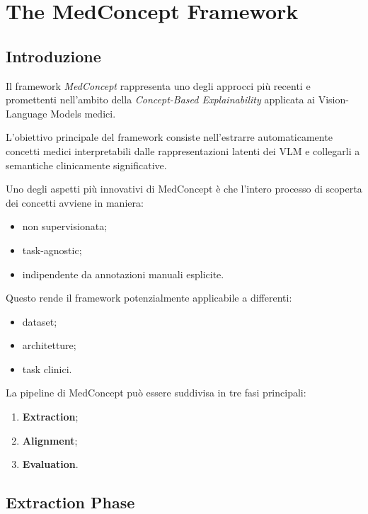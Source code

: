 %
%
\chapter{The MedConcept Framework}

\section{Introduzione}

Il framework \textit{MedConcept} rappresenta uno degli approcci più recenti e promettenti nell'ambito della \textit{Concept-Based Explainability} applicata ai Vision-Language Models medici.

L'obiettivo principale del framework consiste nell'estrarre automaticamente concetti medici interpretabili dalle rappresentazioni latenti dei VLM e collegarli a semantiche clinicamente significative.

Uno degli aspetti più innovativi di MedConcept è che l'intero processo di scoperta dei concetti avviene in maniera:

\begin{itemize}
    \item non supervisionata;
    \item task-agnostic;
    \item indipendente da annotazioni manuali esplicite.
\end{itemize}

Questo rende il framework potenzialmente applicabile a differenti:

\begin{itemize}
    \item dataset;
    \item architetture;
    \item task clinici.
\end{itemize}

La pipeline di MedConcept può essere suddivisa in tre fasi principali:

\begin{enumerate}
    \item \textbf{Extraction};
    \item \textbf{Alignment};
    \item \textbf{Evaluation}.
\end{enumerate}

\section{Extraction Phase}

